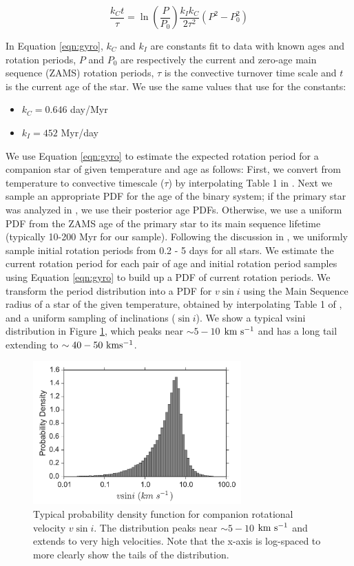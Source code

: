 \documentclass{emulateapj}
\begin{document}
\begin{equation}
\frac{k_Ct}{\tau} = \ln\left ( \frac{P}{P_0} \right ) \frac{k_Ik_C}{2\tau^2} (P^2 - P_0^2)
\label{eqn:gyro}
\end{equation}

In Equation \ref{eqn:gyro}, $k_C$ and $k_I$ are constants fit to data with known ages and rotation periods, $P$ and $P_0$ are respectively the current and zero-age main sequence (ZAMS) rotation periods, $\tau$ is the convective turnover time scale and $t$ is the current age of the star. We use the same values that \cite{Barnes2010b} use for the constants:

\begin{itemize}
\item $k_C = 0.646$ day/Myr
\item $k_I = 452$ Myr/day
\end{itemize}

We use Equation \ref{eqn:gyro} to estimate the expected rotation period for a companion star of given temperature and age as follows: First, we convert from temperature to convective timescale ($\tau$) by interpolating Table 1 in \citet{Barnes2010a}. Next we sample an appropriate PDF for the age of the binary system; if the primary star was analyzed in \citet{David2015}, we use their posterior age PDFs. Otherwise, we use a uniform PDF from the ZAMS age of the primary star to its main sequence lifetime (typically 10-200 Myr for our sample). Following the discussion in \cite{Barnes2010b}, we uniformly sample initial rotation periods from 0.2 - 5 days for all stars. We estimate the current rotation period for each pair of age and initial rotation period samples using Equation \ref{eqn:gyro} to build up a PDF of current rotation periods. We transform the period distribution into a PDF for $v\sin{i}$ using the Main Sequence radius of a star of the given temperature, obtained by interpolating Table 1 of \cite{Barnes2010a}, and a uniform sampling of inclinations ($\sin{i}$). We show a typical vsini distribution in Figure \ref{fig:vsini}, which peaks near $\sim 5-10$ $\rm km \ s^{-1}$ and has a long tail extending to $\sim 40-50 \ \rm km s^{-1}$.


\begin{figure}
    \centering
    \includegraphics[width=80mm]{vsini_PDF.pdf}
    \caption{Typical probability density function for companion rotational velocity $v\sin{i}$. The distribution peaks near $\sim 5-10$ $\rm km \ s^{-1}$ and extends to very high velocities. Note that the x-axis is log-spaced to more clearly show the tails of the distribution.}
    \label{fig:vsini}
\end{figure}
\end{document}
